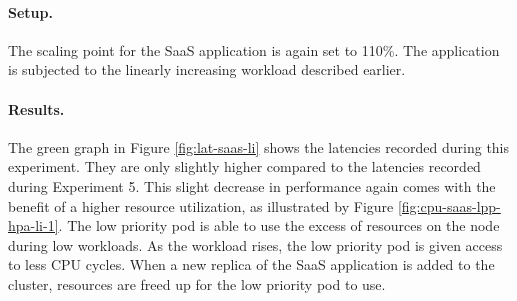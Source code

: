 \paragraph{Setup.}
The scaling point for the SaaS application is again set to 110\%. The application is subjected to the linearly increasing workload described earlier.


\paragraph{Results.}
The green graph in Figure \ref{fig:lat-saas-li} shows the latencies recorded during this experiment. They are only slightly higher compared to the latencies recorded during Experiment 5. This slight decrease in performance again comes with the benefit of a higher resource utilization, as illustrated by Figure \ref{fig:cpu-saas-lpp-hpa-li-1}. The low priority pod is able to use the excess of resources on the node during low workloads. As the workload rises, the low priority pod is given access to less CPU cycles. When a new replica of the SaaS application is added to the cluster, resources are freed up for the low priority pod to use. 

